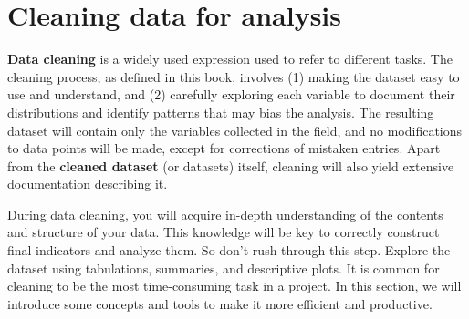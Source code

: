 \section{Cleaning data for analysis}

\textbf{Data cleaning} is a widely used expression used to refer to different tasks.
The cleaning process, as defined in this book, involves
(1) making the dataset easy to use and understand, and 
(2) carefully exploring each variable to document their distributions and identify patterns that may bias the analysis.
The resulting dataset will contain only the variables collected in the field, and
no modifications to data points will be made, 
except for corrections of mistaken entries.
Apart from the \textbf{cleaned dataset} (or datasets) itself,
cleaning will also yield extensive documentation describing  it.

During data cleaning, you will acquire in-depth understanding of the contents and structure of your data.
This knowledge will be key to correctly construct final indicators and analyze them.
So don't rush through this step.
Explore the dataset using tabulations, summaries, and descriptive plots.
It is common for cleaning to be the most time-consuming task in a project.
In this section, we will introduce some concepts and tools to make it more efficient and productive.

